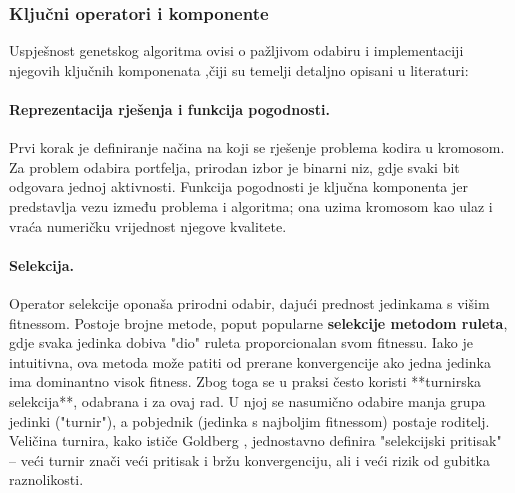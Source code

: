 \subsubsection{Ključni operatori i komponente}

Uspješnost genetskog algoritma ovisi o pažljivom odabiru i implementaciji njegovih ključnih komponenata ,čiji su temelji detaljno opisani u literaturi\cite{Goldberg1989}:

\paragraph{Reprezentacija rješenja i funkcija pogodnosti.} Prvi korak je definiranje načina na koji se rješenje problema kodira u kromosom. Za problem odabira portfelja, prirodan izbor je binarni niz, gdje svaki bit odgovara jednoj aktivnosti. Funkcija pogodnosti je ključna komponenta jer predstavlja vezu između problema i algoritma; ona uzima kromosom kao ulaz i vraća numeričku vrijednost njegove kvalitete.

\paragraph{Selekcija.} Operator selekcije oponaša prirodni odabir, dajući prednost jedinkama s višim fitnessom. Postoje brojne metode, poput popularne \textbf{selekcije metodom ruleta}, gdje svaka jedinka dobiva "dio" ruleta proporcionalan svom fitnessu. Iako je intuitivna, ova metoda može patiti od prerane konvergencije ako jedna jedinka ima dominantno visok fitness. Zbog toga se u praksi često koristi **turnirska selekcija**, odabrana i za ovaj rad. U njoj se nasumično odabire manja grupa jedinki ("turnir"), a pobjednik (jedinka s najboljim fitnessom) postaje roditelj. Veličina turnira, kako ističe Goldberg \cite{Goldberg1989}, jednostavno definira "selekcijski pritisak" – veći turnir znači veći pritisak i bržu konvergenciju, ali i veći rizik od gubitka raznolikosti.

